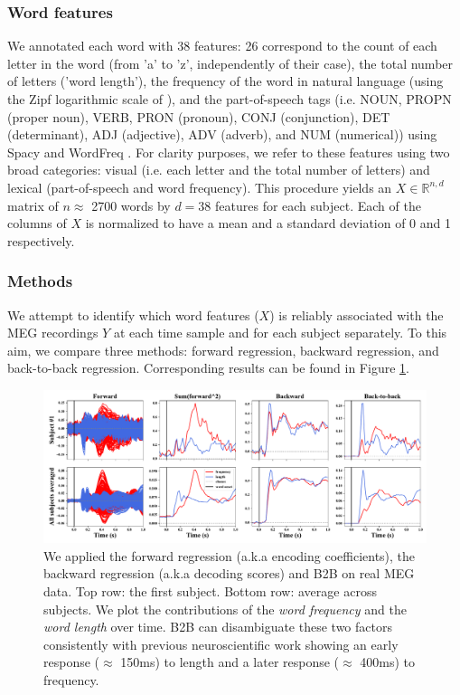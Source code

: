 \subsubsection{Word features} We annotated each word with 38 features: 26
correspond to the count of each letter in the word (from 'a' to 'z',
independently of their case), the total number of letters ('word length'), the
frequency of the word in natural language (using the Zipf logarithmic scale
of \citep{van2014subtlex}), and the part-of-speech tags (i.e. NOUN, PROPN (proper
noun), VERB, PRON (pronoun), CONJ (conjunction), DET (determinant), ADJ
(adjective), ADV (adverb), and NUM (numerical)) using Spacy \citep{spacy2} and
WordFreq \citep{speerwordfreq}. For clarity purposes, we refer to these
features using two broad categories: visual (i.e. each letter and the total
number of letters) and lexical (part-of-speech and word frequency). This
procedure yields an $X \in \mathbb{R}^{n, d}$ matrix of $n\approx$ 2700 words by
$d=38$ features for each subject. Each of the columns of $X$ is normalized to
have a mean and a standard deviation of 0 and 1 respectively.

\subsubsection{Methods}

We attempt to identify which word features ($X$) is reliably associated with the MEG recordings $Y$ at each time sample and for each subject separately. To this aim,
we compare three methods: forward regression, backward regression, and back-to-back regression.
Corresponding results can be found in Figure \ref{fig:meg_twocurves}.

\begin{figure}[t!]
  \centering
  \includegraphics[width=\textwidth, trim=0cm 0cm 0cm 0cm, clip=True]{figures/meg_twocurves.pdf}
  \caption{We applied the forward regression (a.k.a encoding coefficients), the backward regression (a.k.a decoding scores) and B2B on real MEG data. Top row: the first subject. Bottom row: average across subjects.
  We plot the contributions of the \textit{word frequency} and the \textit{word
  length} over time. B2B can disambiguate these two factors consistently with
  previous neuroscientific work \cite{kutas2011thirty}\citep{pegado2014timing}
  showing an early response ($\approx$ 150ms) to length and a later response
  ($\approx$ 400ms) to frequency.}
  \label{fig:meg_twocurves}
\end{figure}

